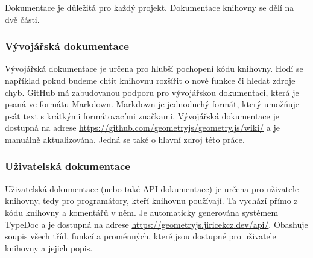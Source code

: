 Dokumentace je důležitá pro každý projekt.
Dokumentace knihovny se dělí na dvě části.

\subsubsection{Vývojářská dokumentace}
\label{subsubsec:developer-documentation}

Vývojářská dokumentace je určena pro hlubší pochopení kódu knihovny.
Hodí se například pokud budeme chtít knihovnu rozšířit o nové funkce či hledat zdroje chyb.
GitHub má zabudovanou podporu pro vývojářskou dokumentaci, která je psaná ve formátu Markdown.
Markdown je jednoduchý formát, který umožňuje psát text s krátkými formátovacími značkami.
Vývojářská dokumentace je dostupná na adrese \url{https://github.com/geometryjs/geometry.js/wiki/} a je manuálně aktualizována. 
Jedná se také o hlavní zdroj této práce.

\subsubsection{Uživatelská dokumentace}
\label{subsubsec:user-documentation}

Uživatelská dokumentace (nebo také API dokumentace) je určena pro uživatele knihovny, tedy pro programátory, kteří knihovnu používají.
Ta vychází přímo z kódu knihovny a komentářů v něm.
Je automaticky generována systémem TypeDoc a je dostupná na adrese \url{https://geometryjs.jiricekcz.dev/api/}.
Obashuje soupis všech tříd, funkcí a proměnných, které jsou dostupné pro uživatele knihovny a jejich popis.